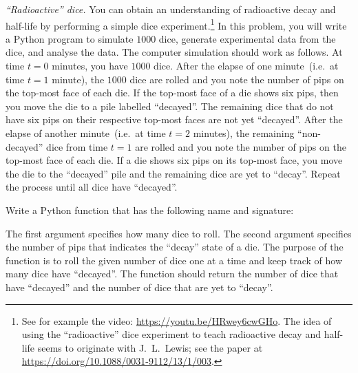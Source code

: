 \documentclass[a4paper,oneside,12pt]{article}
\begin{document}
\begin{problem}
\item\label{prob:exponential:radioactive_dice}
  \emph{``Radioactive'' dice.}
  You can obtain an understanding of radioactive decay and half-life
  by performing a simple dice experiment.\footnote{
    See for example the video:
    \url{https://youtu.be/HRwey6cwGHo}.  The idea of using the
    ``radioactive'' dice experiment to teach radioactive decay and
    half-life seems to originate with J.~L.~Lewis; see the paper at
    \url{https://doi.org/10.1088/0031-9112/13/1/003}.
  }
  In this problem, you will write a Python program to simulate $1000$
  dice, generate experimental data from the dice, and analyse the
  data.  The computer simulation should work as follows.  At time
  $t = 0$ minutes, you have $1000$ dice.  After the elapse of one
  minute~(i.e.~at time $t = 1$ minute), the $1000$ dice are rolled and
  you note the number of pips on the top-most face of each die.  If
  the top-most face of a die shows six pips, then you move the die to
  a pile labelled ``decayed''.  The remaining dice that do not have
  six pips on their respective top-most faces are not yet ``decayed''.
  After the elapse of another minute~(i.e.~at time $t = 2$ minutes),
  the remaining ``non-decayed'' dice from time $t = 1$ are rolled and
  you note the number of pips on the top-most face of each die.  If a
  die shows six pips on its top-most face, you move the die to the
  ``decayed'' pile and the remaining dice are yet to ``decay''.
  Repeat the process until all dice have ``decayed''.
  \begin{packedenum}
  \item\label{subprob:exponential:radioactive_dice_simulation_roll_dice}
    Write a Python function that has the following name and signature:
    \begin{center}
    \end{center}
    The first argument  specifies how many dice to roll.  The
    second argument  specifies the number of pips
    that indicates the ``decay'' state of a die.  The purpose of the
    function  is to roll the given number of dice
    one at a time and keep track of how many dice have ``decayed''.
    The function should return the number of dice that have
    ``decayed'' and the number of dice that are yet to ``decay''.


\end{packedenum}
\end{problem}
\end{document}
